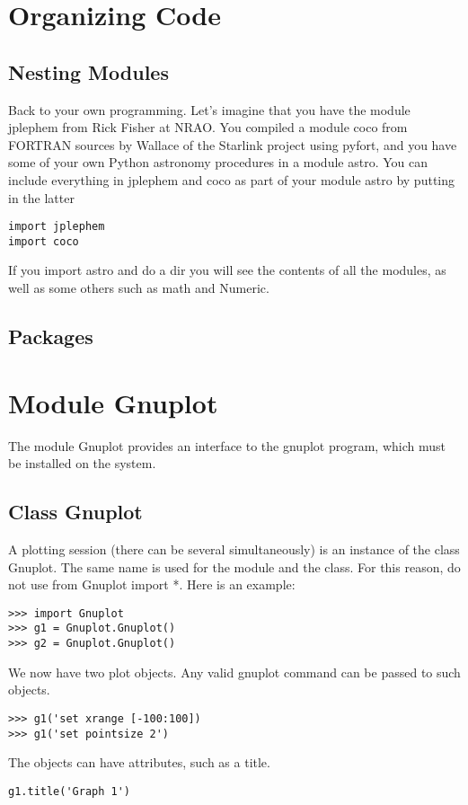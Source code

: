 \documentclass{article}
\begin{document}
\section{Organizing Code}

\subsection{Nesting Modules}

Back to your own programming.  Let's imagine that you have the module
{\ttfamily jplephem} from Rick Fisher at NRAO.  You compiled a module
{\ttfamily coco} from FORTRAN sources by Wallace of the Starlink project
using {\ttfamily pyfort},
and you have some of your own Python astronomy procedures in a module
{\ttfamily astro}. You can include everything in  {\ttfamily jplephem} and
{\ttfamily coco} as part of your module {\ttfamily astro} by putting
in the latter
\begin{verbatim}
import jplephem
import coco
\end{verbatim}
If you import {\ttfamily astro} and do a {\ttfamily dir{}} you will see
the contents of all the modules, as well as some others such as
{\ttfamily math} and {\ttfamily Numeric}.

\subsection{Packages}

\appendix

\section{Module {\ttfamily Gnuplot}}

The module {\ttfamily Gnuplot} provides an interface to the {\ttfamily gnuplot}
program, which must be installed on the system.

\subsection{Class {\ttfamily Gnuplot}}

A plotting session (there can be several simultaneously) is an instance of the
class {\ttfamily Gnuplot}.  The same name is used for the module and the class.
For this reason, do not use {\ttfamily from Gnuplot import *}.
Here is an example:
\begin{verbatim}
>>> import Gnuplot
>>> g1 = Gnuplot.Gnuplot()
>>> g2 = Gnuplot.Gnuplot()
\end{verbatim}
We now have two plot objects.  Any valid {\ttfamily gnuplot} command can be passed
to such objects.
\begin{verbatim}
>>> g1('set xrange [-100:100])
>>> g1('set pointsize 2')
\end{verbatim}
The objects can have attributes, such as a title.
\begin{verbatim}
g1.title('Graph 1')
\end{verbatim}
\end{document}
